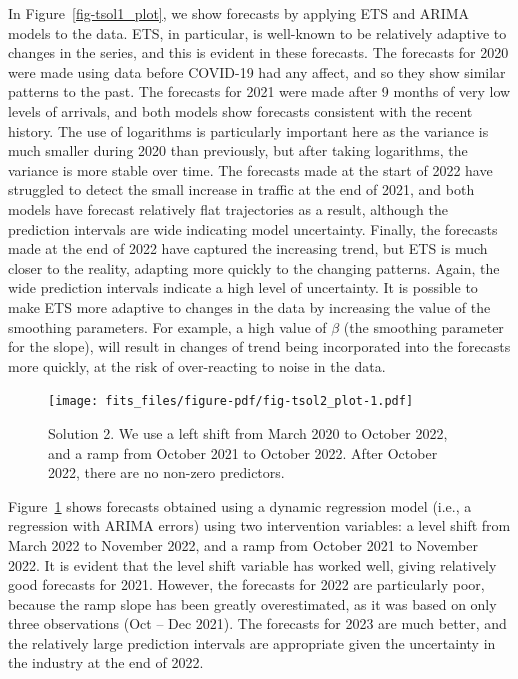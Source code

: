 \documentclass[11pt,a4paper,]{article}
\begin{document}
In Figure~\ref{fig-tsol1_plot}, we show forecasts by applying ETS and
ARIMA models to the data. ETS, in particular, is well-known to be
relatively adaptive to changes in the series, and this is evident in
these forecasts. The forecasts for 2020 were made using data before
COVID-19 had any affect, and so they show similar patterns to the past.
The forecasts for 2021 were made after 9 months of very low levels of
arrivals, and both models show forecasts consistent with the recent
history. The use of logarithms is particularly important here as the
variance is much smaller during 2020 than previously, but after taking
logarithms, the variance is more stable over time. The forecasts made at
the start of 2022 have struggled to detect the small increase in traffic
at the end of 2021, and both models have forecast relatively flat
trajectories as a result, although the prediction intervals are wide
indicating model uncertainty. Finally, the forecasts made at the end of
2022 have captured the increasing trend, but ETS is much closer to the
reality, adapting more quickly to the changing patterns. Again, the wide
prediction intervals indicate a high level of uncertainty. It is
possible to make ETS more adaptive to changes in the data by increasing
the value of the smoothing parameters. For example, a high value of
\(\beta\) (the smoothing parameter for the slope), will result in
changes of trend being incorporated into the forecasts more quickly, at
the risk of over-reacting to noise in the data.

\begin{figure}[t]

{\centering \texttt{[image: fits\_files/figure-pdf/fig-tsol2\_plot-1.pdf]}

}

\caption{\label{fig-tsol2_plot}Solution 2. We use a left shift from
March 2020 to October 2022, and a ramp from October 2021 to October
2022. After October 2022, there are no non-zero predictors.}

\end{figure}

Figure~\ref{fig-tsol2_plot} shows forecasts obtained using a dynamic
regression model (i.e., a regression with ARIMA errors) using two
intervention variables: a level shift from March 2022 to November 2022,
and a ramp from October 2021 to November 2022. It is evident that the
level shift variable has worked well, giving relatively good forecasts
for 2021. However, the forecasts for 2022 are particularly poor, because
the ramp slope has been greatly overestimated, as it was based on only
three observations (Oct -- Dec 2021). The forecasts for 2023 are much
better, and the relatively large prediction intervals are appropriate
given the uncertainty in the industry at the end of 2022.
\end{document}
